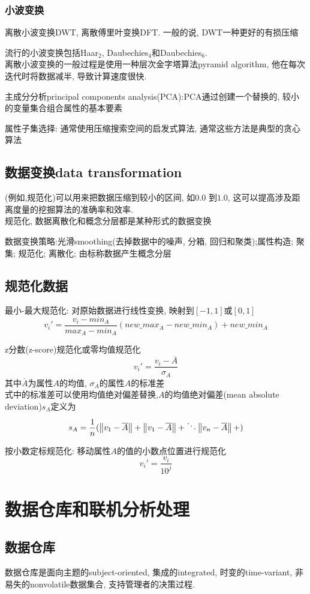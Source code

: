 \documentclass{article}
\begin{document}
\subsubsection{小波变换}
离散小波变换DWT, 离散傅里叶变换DFT. 一般的说, DWT一种更好的有损压缩

流行的小波变换包括Haar$_2$, Daubechies$_4$和Daubechies$_6$. \\
离散小波变换的一般过程是使用一种层次金字塔算法pyramid algorithm, 他在每次迭代时将数据减半, 导致计算速度很快.

主成分分析principal components analysis(PCA):PCA通过创建一个替换的, 较小的变量集合组合属性的基本要素

属性子集选择: 通常使用压缩搜索空间的启发式算法, 通常这些方法是典型的贪心算法
\subsection{数据变换data transformation}
(例如,规范化)可以用来把数据压缩到较小的区间, 如$0.0$ 到$1.0$, 这可以提高涉及距离度量的挖掘算法的准确率和效率.\\
规范化, 数据离散化和概念分层都是某种形式的数据变换

数据变换策略:光滑smoothing(去掉数据中的噪声, 分箱, 回归和聚类);属性构造; 聚集; 规范化; 离散化; 由标称数据产生概念分层

\subsection{规范化数据}
最小-最大规范化: 对原始数据进行线性变换, 映射到$[-1,1]$或$[0,1]$
$$
v_i' = \dfrac{v_i - min_A }{max_A - min_A}(new\_max_A - new\_min_A) + new\_min_A
$$

z分数(z-score)规范化或零均值规范化
$$
v_i' = \dfrac{ v_i - \overline{A}}{\sigma_A}
$$
其中$\overline{A}$为属性$A$的均值, $\sigma_A$的属性$A$的标准差 \\
式中的标准差可以使用均值绝对偏差替换,$A$的均值绝对偏差(mean absolute deviation)$s_A$定义为
$$
s_A = \dfrac{1}{n}( \left\Vert v_1 - \overline{A}\right\Vert+ \left\Vert v_1 - \overline{A}\right\Vert+ \ddots \left\Vert v_n - \overline{A}\right\Vert+)
$$

按小数定标规范化: 移动属性$A$的值的小数点位置进行规范化
$$
v_i' = \dfrac{v_i}{10^j}
$$

\section{数据仓库和联机分析处理}
\subsection{数据仓库}
数据仓库是面向主题的subject-oriented, 集成的integrated, 时变的time-variant, 非易失的nonvolatile数据集合, 支持管理者的决策过程.
\end{document}
